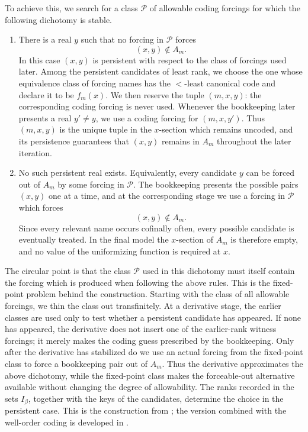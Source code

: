 \documentclass[a4paper,11pt]{article}
\begin{document}
To achieve this, we search for a class $\mathcal P$ of allowable coding forcings for which the following dichotomy is stable.

\begin{enumerate}
\item[(a)] There is a real $y$ such that no forcing in $\mathcal P$ forces
\[
(x,y)\notin A_m.
\]
In this case $(x,y)$ is persistent with respect to the class of forcings used later.  Among the persistent candidates of least rank, we choose the one whose equivalence class of forcing names has the $<$-least canonical code and declare it to be $f_m(x)$.  We then reserve the tuple $(m,x,y)$: the corresponding coding forcing is never used.  Whenever the bookkeeping later presents a real $y'\neq y$, we use a coding forcing for $(m,x,y')$.  Thus $(m,x,y)$ is the unique tuple in the $x$-section which remains uncoded, and its persistence guarantees that $(x,y)$ remains in $A_m$ throughout the later iteration.

\item[(b)] No such persistent real exists.  Equivalently, every candidate $y$ can be forced out of $A_m$ by some forcing in $\mathcal P$.  The bookkeeping presents the possible pairs $(x,y)$ one at a time, and at the corresponding stage we use a forcing in $\mathcal P$ which forces
\[
(x,y)\notin A_m.
\]
Since every relevant name occurs cofinally often, every possible candidate is eventually treated.  In the final model the $x$-section of $A_m$ is therefore empty, and no value of the uniformizing function is required at $x$.
\end{enumerate}

The circular point is that the class $\mathcal P$ used in this dichotomy must itself contain the forcing which is produced when following the above rules. This is the fixed-point problem behind the construction. Starting with the class of all allowable forcings, we thin the class out transfinitely. At a derivative stage, the earlier classes are used only to test whether a persistent candidate has appeared. If none has appeared, the derivative does not insert one of the earlier-rank witness forcings; it merely makes the coding guess prescribed by the bookkeeping. Only after the derivative has stabilized do we use an actual forcing from the fixed-point class to force a bookkeeping pair out of $A_m$. Thus the derivative approximates the above dichotomy, while the fixed-point class makes the forceable-out alternative available without changing the degree of allowability. The ranks recorded in the sets $I_\beta$, together with the keys of the candidates, determine the choice in the persistent case. This is the construction from \cite{Uniformization}; the version combined with the well-order coding is developed in \cite{Uniformization with wellorder}.
\end{document}
